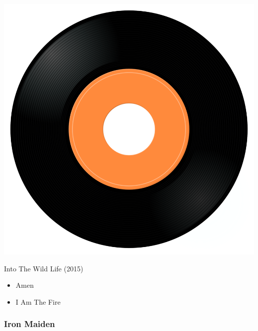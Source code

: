 \begin{minipage}[t]{0.25\textwidth}\vspace{0pt}
\captionsetup{type=figure}
\includegraphics[width=\textwidth]{Images/cover.png}
\caption*{Into The Wild Life (2015)}
\end{minipage}
\begin{minipage}[t]{0.25\textwidth}\vspace{0pt}
\begin{itemize}[nosep,leftmargin=1em,labelwidth=*,align=left]
	\setlength{\itemsep}{0pt}
	\item Amen
	\item I Am The Fire
\end{itemize}
\end{minipage}

\subsubsection{Iron Maiden}

